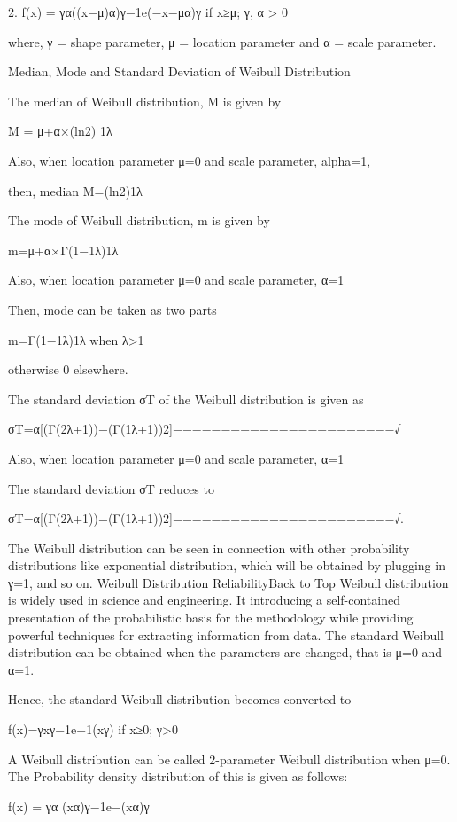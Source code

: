 \documentclass{beamer}
\begin{document}
	2. f(x) = γα((x−μ)α)γ−1e(−x−μα)γ if x≥μ; γ, α > 0 
	
	where, γ = shape parameter, μ = location parameter and α = scale parameter.
	
	Median, Mode and Standard Deviation of Weibull Distribution
	
	The median of Weibull distribution, M is given by
	
	M = μ+α×(ln2) 1λ
	
	Also, when location parameter μ=0 and scale parameter, alpha=1,
	
	then, median M=(ln2)1λ
	
	The mode of Weibull distribution, m is given by
	
	m=μ+α×Γ(1−1λ)1λ
	
	Also, when location parameter μ=0 and scale parameter, α=1
	
	Then, mode can be taken as two parts
	
	m=Γ(1−1λ)1λ when λ>1 
	
	otherwise 0 elsewhere.
	
	The standard deviation σT of the Weibull distribution is given as
	
	σT=α[(Γ(2λ+1))−(Γ(1λ+1))2]−−−−−−−−−−−−−−−−−−−−−−−√ 
	
	Also, when location parameter μ=0 and scale parameter, α=1
	
	The standard deviation σT reduces to
	
	σT=α[(Γ(2λ+1))−(Γ(1λ+1))2]−−−−−−−−−−−−−−−−−−−−−−−√.
	
	The Weibull distribution can be seen in connection with other probability distributions like exponential distribution, which will be obtained by plugging in γ=1, and so on.
	Weibull Distribution ReliabilityBack to Top
	Weibull distribution is widely used in science and engineering. It introducing a self-contained presentation of the probabilistic basis for the methodology while providing powerful techniques for extracting information from data. The standard Weibull distribution can be obtained when the parameters are changed, that is μ=0 and α=1.
	
	Hence, the standard Weibull distribution becomes converted to
	
	f(x)=γxγ−1e−1(xγ) if x≥0; γ>0 
	
	A Weibull distribution can be called 2-parameter Weibull distribution when μ=0. The Probability density distribution of this is given as follows:
	
	f(x) = γα (xα)γ−1e−(xα)γ
	
\end{document}
